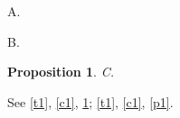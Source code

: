\documentclass{svjour3}
\newtheorem{prop}[theorem]{Proposition}
\begin{document}
\begin{theorem}\label{t1} A. \end{theorem}
\begin{conj}\label{c1} B. \end{conj}
\begin{prop}\label{p1} C. \end{prop}
See \ref{t1}, \ref{c1}, \ref{p1}; \autoref{t1}, \autoref{c1}, \autoref{p1}.
\end{document}

